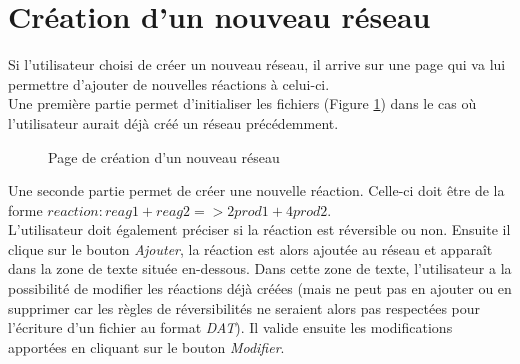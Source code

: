 \section{Création d'un nouveau réseau}

Si l'utilisateur choisi de créer un nouveau réseau, il arrive sur une page qui va lui permettre d'ajouter de nouvelles réactions à celui-ci. \\

Une première partie permet d'initialiser les fichiers (Figure \ref{creation1}) dans le cas où l'utilisateur aurait déjà créé un réseau précédemment.\\

\begin{figure}[!ht]
	\begin{center}
		\caption{Page de création d'un nouveau réseau}
  		\label{creation1}
  	\end{center}	
\end{figure}

Une seconde partie permet de créer une nouvelle réaction. Celle-ci doit être de la forme $reaction : reag1 + reag2 => 2 prod1 + 4 prod2$. \\
L'utilisateur doit également préciser si la réaction est réversible ou non. Ensuite il clique sur le bouton \emph{Ajouter}, la réaction est alors ajoutée au réseau et apparaît dans la zone de texte située en-dessous. Dans cette zone de texte, l'utilisateur a la possibilité de modifier les réactions déjà créées (mais ne peut pas en ajouter ou en supprimer car les règles de réversibilités ne seraient alors pas respectées pour l'écriture d'un fichier au format \emph{DAT}). Il valide ensuite les modifications apportées en cliquant sur le bouton \emph{Modifier}.\\

